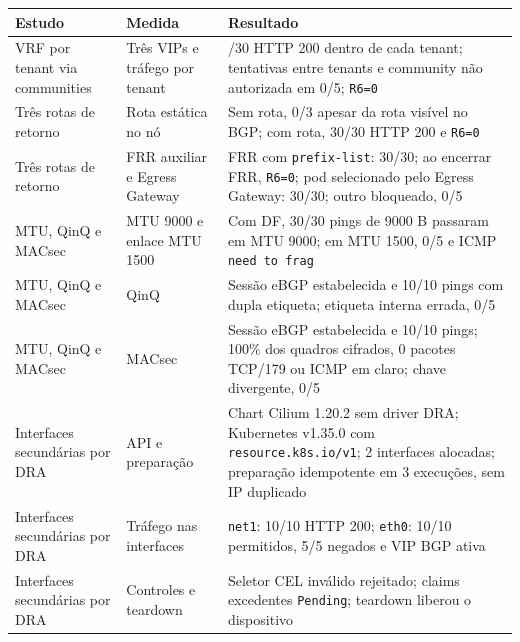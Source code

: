 \documentclass[12pt,openany,oneside,a4paper,chapter=TITLE,english,brazil]{abntex2}
\begin{document}
\begin{quadro}[!htbp]
\caption{Resultados de VRF, enlace e DRA}
\footnotesize
\begin{tabularx}{\textwidth}{|>{\raggedright\arraybackslash\hsize=0.722\hsize}X|>{\raggedright\arraybackslash\hsize=0.722\hsize}X|>{\raggedright\arraybackslash\hsize=1.555\hsize}X|}
\hline
\textbf{Estudo} & \textbf{Medida} & \textbf{Resultado} \\
\hline
VRF por tenant via communities & Três VIPs e tráfego por tenant & 30/30 HTTP 200 dentro de cada tenant; tentativas entre tenants e
community não autorizada em 0/5; \texttt{R6=\allowbreak{}0} \\
\hline
Três rotas de retorno & Rota estática no nó & Sem rota, 0/3 apesar da rota visível no BGP; com rota, 30/30 HTTP 200 e
\texttt{R6=\allowbreak{}0} \\
\hline
Três rotas de retorno & FRR auxiliar e Egress Gateway & FRR com \texttt{prefix-{}\allowbreak{}list}: 30/30; ao encerrar FRR,
\texttt{R6=\allowbreak{}0}; pod selecionado pelo Egress Gateway: 30/30;
outro bloqueado, 0/5 \\
\hline
MTU, QinQ e MACsec & MTU 9000 e enlace MTU 1500 & Com DF, 30/30 pings de 9000 B passaram em MTU 9000; em MTU 1500, 0/5 e
ICMP \texttt{need to frag} \\
\hline
MTU, QinQ e MACsec & QinQ & Sessão eBGP estabelecida e 10/10 pings com dupla etiqueta; etiqueta
interna errada, 0/5 \\
\hline
MTU, QinQ e MACsec & MACsec & Sessão eBGP estabelecida e 10/10 pings; 100\% dos quadros cifrados, 0
pacotes TCP/179 ou ICMP em claro; chave divergente, 0/5 \\
\hline
Interfaces secundárias por DRA & API e preparação & Chart Cilium 1.20.2 sem driver DRA; Kubernetes v1.35.0 com
\texttt{resource.\allowbreak{}k8s.\allowbreak{}io/\allowbreak{}v1}; 2
interfaces alocadas; preparação idempotente em 3 execuções, sem IP
duplicado \\
\hline
Interfaces secundárias por DRA & Tráfego nas interfaces & \texttt{net1}: 10/10 HTTP 200; \texttt{eth0}: 10/10 permitidos, 5/5
negados e VIP BGP ativa \\
\hline
Interfaces secundárias por DRA & Controles e teardown & Seletor CEL inválido rejeitado; claims excedentes \texttt{Pending};
teardown liberou o dispositivo \\
\hline
\end{tabularx}
\end{quadro}
\end{document}
